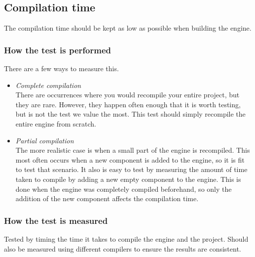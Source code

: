 \subsection{Compilation time}
The compilation time should be kept as low as possible when building the engine.


\subsubsection*{How the test is performed}
There are a few ways to measure this.

\begin{itemize}

    \item \noindent\textit{Complete compilation}\\
    There are occurrences where you would recompile your entire project, but they are rare.
    However, they happen often enough that it is worth testing, but is not the test we value the most. This test should simply recompile the entire engine from scratch.

    \item \noindent\textit{Partial compilation}\\
    The more realistic case is when a small part of the engine is recompiled.
    This most often occurs when a new component is added to the engine, so it is fit to test that scenario.
    It also is easy to test by measuring the amount of time taken to compile by adding a new empty component to the engine.
    This is done when the engine was completely compiled beforehand, so only the addition of the new component affects the compilation time.

\end{itemize}

\subsubsection*{How the test is measured}
Tested by timing the time it takes to compile the engine and the project. 
Should also be measured using different compilers to ensure the results are consistent.

